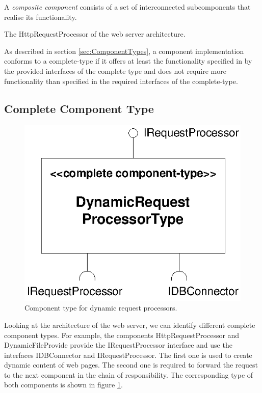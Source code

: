 A \emph{composite component} consists of a set of interconnected subcomponents
that realise its functionality. 

The HttpRequestProcessor of the web server architecture.

As described in section \ref{sec:ComponentTypes}, a component implementation
conforms to a complete-type if it offers at least the functionality specified
in by the provided interfaces of the complete type and does not require more
functionality than specified in the required interfaces of the complete-type.

\subsection{Complete Component Type}

\begin{figure}[htbp]
\centering
\includegraphics[scale=0.85]{example/DynamicRequestProcessorType}
\caption{Component type for dynamic request processors.}
\label{fig:DynamicRequestProcessorType}
\end{figure}

Looking at the architecture of the web server, we can identify different
complete component types. For example, the components HttpRequestProcessor and
DynamicFileProvide provide the IRequestProcessor interface and use the
interfaces IDBConnector and IRequestProcessor. The first one is used to create
dynamic content of web pages. The second one is required to forward the request
to the next component in the chain of responsibility. The corresponding type of
both components is shown in figure \ref{fig:DynamicRequestProcessorType}.

